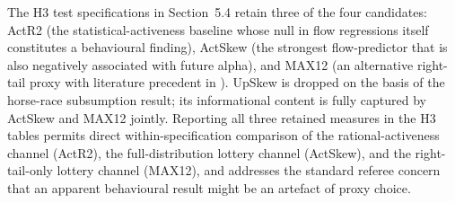 \documentclass[12pt]{article}
\begin{document}
The H3 test specifications in Section~5.4 retain three of the four
candidates: ActR2 (the statistical-activeness baseline whose null in
flow regressions itself constitutes a behavioural finding), ActSkew
(the strongest flow-predictor that is also negatively associated with
future alpha), and MAX12 (an alternative right-tail proxy with
literature precedent in \textcite{ChengEtal2025}). UpSkew is dropped
on the basis of the horse-race subsumption result; its informational
content is fully captured by ActSkew and MAX12 jointly. Reporting all
three retained measures in the H3 tables permits direct
within-specification comparison of the rational-activeness channel
(ActR2), the full-distribution lottery channel (ActSkew), and the
right-tail-only lottery channel (MAX12), and addresses the standard
referee concern that an apparent behavioural result might be an
artefact of proxy choice.

\newpage

\clearpage

\nocite{SirriTufano1998, BakerWurgler2007, HuangEtal2015, Petersen2009,
        DanielKlosPollet2016, RapachRinggenbergZhou2016,
        BrunnermeierPedersen2009, ChengEtal2025, BerkVanBinsbergen2015,
        AmihudGoyenko2013, CremersPetajisto2009, BerkGreen2004}
\printbibliography
\end{document}
